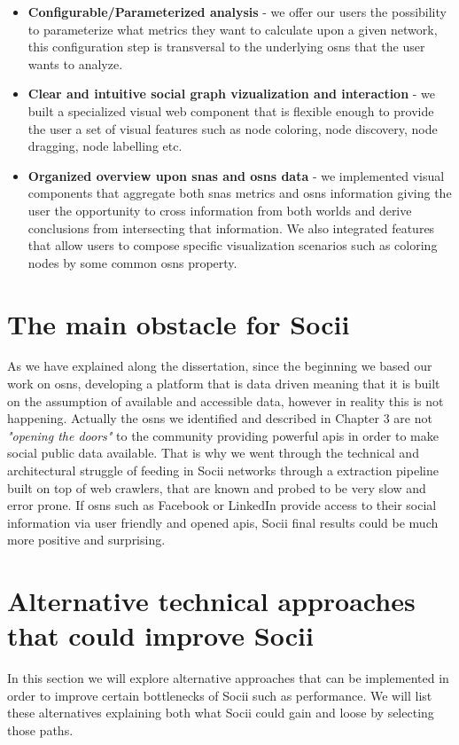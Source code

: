 \begin{itemize}
    \item \textbf{Configurable/Parameterized analysis} - we offer our users the possibility to parameterize what metrics they want to calculate upon a given network, this configuration step is transversal to the underlying \glspl{osn} that the user wants to analyze.
    \item \textbf{Clear and intuitive social graph vizualization and interaction} - we built a specialized visual web component that is flexible enough to provide the user a set of visual features such as node coloring, node discovery, node dragging, node labelling etc.
    \item \textbf{Organized overview upon \glspl{sna} and \glspl{osn} data} - we implemented visual components that aggregate both \glspl{sna} metrics and \glspl{osn} information giving the user the opportunity to cross information from both worlds and derive conclusions from intersecting that information. We also integrated features that allow users to compose specific visualization scenarios such as coloring nodes by some common \glspl{osn} property.
\end{itemize}

\section{The main obstacle for Socii}
As we have explained along the dissertation, since the beginning we based our work on \glspl{osn}, developing a platform that is data driven meaning that it is built on the assumption of available and accessible data, however in reality this is not happening. Actually the \glspl{osn} we identified and described in Chapter 3 are not \textit{"opening the doors"} to the community providing powerful \glspl{api} in order to make social public data available. That is why we went through the technical and architectural struggle of feeding in Socii networks through a extraction pipeline built on top of web crawlers, that are known and probed to be very slow and error prone. If \glspl{osn} such as Facebook or LinkedIn provide access to their social information via user friendly and opened \glspl{api}, Socii final results could be much more positive and surprising.

\section{Alternative technical approaches that could improve Socii}
In this section we will explore alternative approaches that can be implemented in order to improve certain bottlenecks of Socii such as performance. We will list these alternatives explaining both what Socii could gain and loose by selecting those paths.

